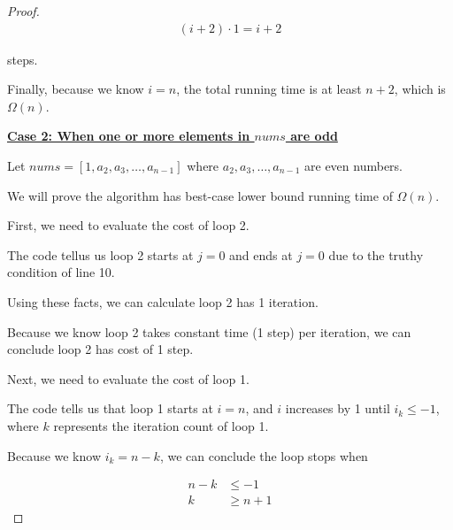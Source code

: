 \documentclass[12pt]{article}
\begin{document}
\begin{enumerate}[a.]
\begin{proof}
        \begin{align}
            (i + 2) \cdot 1 = i + 2
        \end{align}

        steps.

        \bigskip

        Finally, because we know $i = n$, the total running time is at least $n + 2$,
        which is $\Omega(n)$.

        \bigskip

        \underline{\textbf{Case 2: When one or more elements in $nums$ are odd}}

        \bigskip

        Let $nums = [1,a_2,a_3,\dots,a_{n-1}]$ where $a_2,a_3,\dots,a_{n-1}$ are even numbers.

        \bigskip

        We will prove the algorithm has best-case lower bound running time of $\Omega(n)$.

        \bigskip

        First, we need to evaluate the cost of loop 2.

        \bigskip

        The code tellus us loop 2 starts at $j = 0$ and ends at $j = 0$ due to the
        truthy condition of line 10.

        \bigskip

        Using these facts, we can calculate loop 2 has 1 iteration.

        \bigskip

        Because we know loop 2 takes constant time (1 step) per iteration, we can
        conclude loop 2 has cost of 1 step.

        \bigskip

        Next, we need to evaluate the cost of loop 1.

        \bigskip

        The code tells us that loop 1 starts at $i = n$, and $i$ increases by 1 until
        $i_k \leq -1$, where $k$ represents the iteration count of loop 1.

        \bigskip

        Because we know $i_k = n - k$, we can conclude the loop stops when

        \begin{align}
            n - k &\leq - 1\\
            k &\geq n +  1
        \end{align}


\end{proof}
\end{enumerate}
\end{document}
